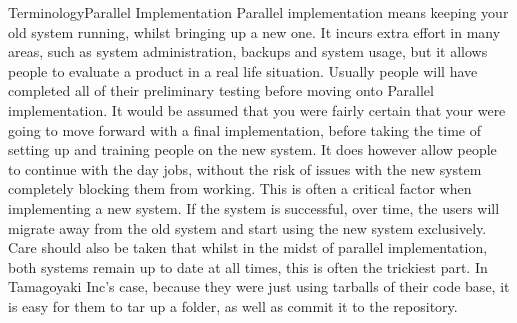 \begin{callout}{Terminology}{Parallel Implementation}
Parallel implementation means keeping your old system running, whilst bringing up a new one.  It incurs extra effort in many areas, such as system administration, backups and system usage, but it allows people to evaluate a product in a real life situation.  Usually people will have completed all of their preliminary testing before moving onto Parallel implementation.  It would be assumed that you were fairly certain that your were going to move forward with a final implementation, before taking the time of setting up and training people on the new system.
\newline
\newline
It does however allow people to continue with the day jobs, without the risk of issues with the new system completely blocking them from working.  This is often a critical factor when implementing a new system.  If the system is successful, over time, the users will migrate away from the old system and start using the new system exclusively.  Care should also be taken that whilst in the midst of parallel implementation, both systems remain up to date at all times, this is often the trickiest part.  In Tamagoyaki Inc's case, because they were just using tarballs of their code base, it is easy for them to tar up a folder, as well as commit it to the repository.
\end{callout}

